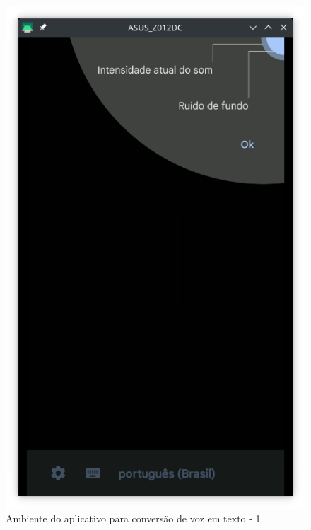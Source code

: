 \documentclass[
  12pt,       %
  openright,      %
  twoside,      %
  a4paper,      %
  english,      %
  french,       %
  spanish,      %
  brazil        %
  ]{abntex2}
\begin{document}
\begin{figure}[!htb]
  \centering
  \begin{minipage}{0.45\textwidth}
    \centering
    \includegraphics[width=\linewidth]{android_1.png}
    \caption{Ambiente do aplicativo para conversão de voz em texto - 1.}
    \label{fig:imagem1}
  \end{minipage}\hfill
  \begin{minipage}{0.45\textwidth}
    \centering

\end{minipage}
\end{figure}
\end{document}
